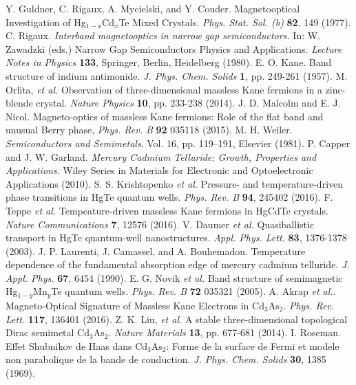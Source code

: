 \documentclass[titlepage,a4paper]{book}
\begin{document}
\begin{thebibliography}{199}
Y. Guldner, C. Rigaux, A. Mycielski, and Y. Couder. Magnetooptical Investigation of Hg$_{1-x}$Cd$_x$Te Mixed Crystals. \textit{Phys. Stat. Sol. (b)} \textbf{82}, 149 (1977).
C. Rigaux. \textit{Interband magnetooptics in narrow gap semiconductors.} In: W. Zawadzki (eds.) Narrow Gap Semiconductors Physics and Applications. \textit{Lecture Notes in Physics} \textbf{133}, Springer, Berlin, Heidelberg (1980).
E. O. Kane. Band structure of indium antimonide. \textit{J. Phys. Chem. Solids} \textbf{1}, pp. 249-261 (1957).
M. Orlita, \textit{et al.} Observation of three-dimensional massless Kane fermions in a zinc-blende crystal. \textit{Nature Physics} \textbf{10}, pp. 233-238 (2014).
J. D. Malcolm and E. J. Nicol. Magneto-optics of massless Kane fermions: Role of the flat band and unusual Berry phase, \textit{Phys. Rev. B} \textbf{92} 035118 (2015).
M. H. Weiler. \textit{Semiconductors and Semimetals}. Vol. 16, pp. 119–191, Elsevier (1981).
P. Capper and J. W. Garland. \textit{Mercury Cadmium Telluride: Growth, Properties and Applications}. Wiley Series in Materials for Electronic and Optoelectronic Applications (2010).
S. S. Krishtopenko \textit{et al.} Pressure- and temperature-driven phase transitions in HgTe quantum wells. \textit{Phys. Rev. B} \textbf{94}, 245402 (2016).
F. Teppe \textit{et al.} Tempeature-driven massless Kane fermions in HgCdTe crystals. \textit{Nature Communications} \textbf{7}, 12576 (2016).
V. Daumer \textit{et al.} Quasiballistic transport in HgTe quantum-well nanostructures. \textit{Appl. Phys. Lett.} \textbf{83}, 1376-1378 (2003).
J. P. Laurenti, J. Camassel, and A. Bouhemadou. Temperature dependence of the fundamental absorption edge of mercury cadmium telluride. \textit{J. Appl. Phys.} \textbf{67}, 6454 (1990).
E. G. Novik \textit{et al.} Band structure of semimagnetic Hg$_{1-y}$Mn$_y$Te quantum wells. \textit{Phys. Rev. B} \textbf{72} 035321 (2005).
A. Akrap \textit{et al.}. Magneto-Optical Signature of Massless Kane Electrons in Cd$_3$As$_2$. \textit{Phys. Rev. Lett.} \textbf{117}, 136401 (2016). 
Z. K. Liu, \textit{et al.} A stable three-dimensional topological Dirac semimetal Cd$_3$As$_2$. \textit{Nature Materials} \textbf{13}, pp. 677-681 (2014).  
I. Roseman. Effet Shubnikov de Haas dans Cd$_3$As$_2$: Forme de la surface de Fermi et modele non parabolique de la bande de conduction. \textit{J. Phys. Chem. Solids} \textbf{30}, 1385 (1969).

\end{thebibliography}
\end{document}
